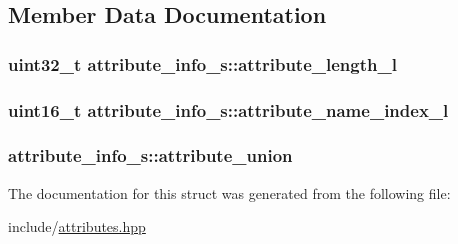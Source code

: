 \subsection{Member Data Documentation}
\hypertarget{structattribute__info__s_a05108c8ce025ccef6f5dd8f2db872253}{
\subsubsection[{attribute\+\_\+length\+\_\+l}]{\setlength{\rightskip}{0pt plus 5cm}uint32\+\_\+t attribute\+\_\+info\+\_\+s\+::attribute\+\_\+length\+\_\+l}}\label{structattribute__info__s_a05108c8ce025ccef6f5dd8f2db872253}
\hypertarget{structattribute__info__s_a21689252627ef43920efed54f5a9e69e}{
\subsubsection[{attribute\+\_\+name\+\_\+index\+\_\+l}]{\setlength{\rightskip}{0pt plus 5cm}uint16\+\_\+t attribute\+\_\+info\+\_\+s\+::attribute\+\_\+name\+\_\+index\+\_\+l}}\label{structattribute__info__s_a21689252627ef43920efed54f5a9e69e}
\hypertarget{structattribute__info__s_a1ca989905be28a2dfe09758a89593b91}{
\subsubsection[{attribute\+\_\+union}]{ attribute\+\_\+info\+\_\+s\+::attribute\+\_\+union}}\label{structattribute__info__s_a1ca989905be28a2dfe09758a89593b91}


The documentation for this struct was generated from the following file\+:\begin{DoxyCompactItemize}
\item 
include/\hyperlink{attributes_8hpp}{attributes.\+hpp}\end{DoxyCompactItemize}
